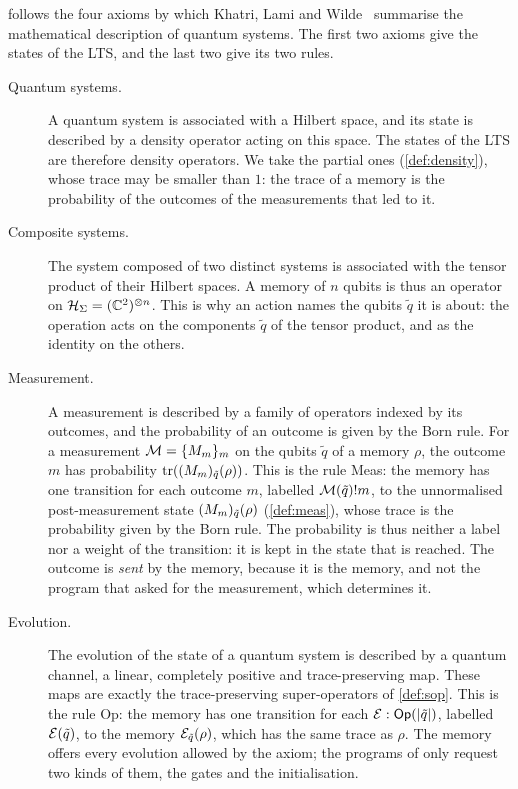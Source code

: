  follows the four axioms by which Khatri, Lami and
Wilde~\cite[Section 3.1]{KLW26} summarise the mathematical description of
quantum systems. The first two axioms give the states of the LTS, and the
last two give its two rules.
\begin{description}
\item[Quantum systems.] A quantum system is associated with a Hilbert space,
  and its state is described by a density operator acting on this space. The
  states of the LTS are therefore density operators. We take the partial
  ones (\cref{def:density}), whose trace may be smaller than $1$: the trace
  of a memory is the probability of the outcomes of the measurements that
  led to it.
\item[Composite systems.] The system composed of two distinct systems is
  associated with the tensor product of their Hilbert spaces. A memory of
  $n$ qubits is thus an operator on
  $\mathcal{H}_\Sigma = (\mathbb{C}^2)^{\otimes n}$. This is why an action names the
  qubits $\tilde q$ it is about: the operation acts on the components
  $\tilde q$ of the tensor product, and as the identity on the others.
\item[Measurement.] A measurement is described by a family of operators
  indexed by its outcomes, and the probability of an outcome is given by
  the Born rule. For a measurement $\mathcal{M} = \{M_m\}_m$ on the qubits
  $\tilde q$ of a memory $\rho$, the outcome $m$ has probability
  $\mathrm{tr}((M_m)_{\tilde q}(\rho))$. This is the rule Meas: the memory has one transition for each
  outcome $m$, labelled $\mathcal{M}(\tilde q)!m$, to the unnormalised post-measurement
  state $(M_m)_{\tilde q}(\rho)$ (\cref{def:meas}), whose trace is the probability given by the
  Born rule. The probability is thus neither a label nor a weight of the
  transition: it is kept in the state that is reached. The outcome is
  \emph{sent} by the memory, because it is the memory, and not the program
  that asked for the measurement, which determines it.
\item[Evolution.] The evolution of the state of a quantum system is
  described by a quantum channel, a linear, completely positive and
  trace-preserving map. These maps are exactly the trace-preserving
  super-operators of \cref{def:sop}. This is the rule Op: the memory has
  one transition for each $\mathcal{E} : \mathsf{Op}(|\tilde q|)$, labelled
  $\mathcal{E}(\tilde q)$, to the memory ${\mathcal{E}}_{\tilde q}(\rho)$, which has the same
  trace as $\rho$. The memory offers every evolution allowed by the axiom;
  the programs of \lqCCS only request two kinds of them, the gates and the
  initialisation.
\end{description}

